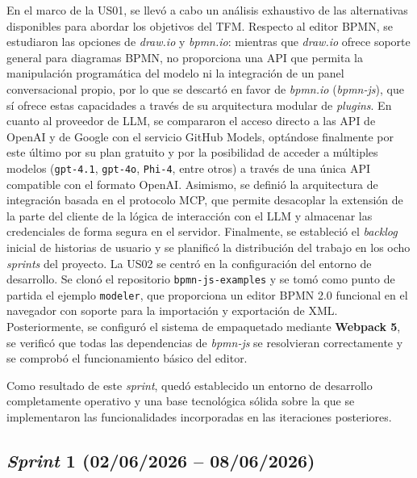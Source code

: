 En el marco de la US01, se llevó a cabo un análisis exhaustivo de las alternativas disponibles para abordar los objetivos del TFM. Respecto al editor BPMN, se estudiaron las opciones de \textit{draw.io} y \textit{bpmn.io}: mientras que \textit{draw.io} ofrece soporte general para diagramas BPMN, no proporciona una API que permita la manipulación programática del modelo ni la integración de un panel conversacional propio, por lo que se descartó en favor de \textit{bpmn.io} (\textit{bpmn-js}), que sí ofrece estas capacidades a través de su arquitectura modular de \textit{plugins}. En cuanto al proveedor de LLM, se compararon el acceso directo a las API de OpenAI y de Google con el servicio GitHub Models, optándose finalmente por este último por su plan gratuito y por la posibilidad de acceder a múltiples modelos (\texttt{gpt-4.1}, \texttt{gpt-4o}, \texttt{Phi-4}, entre otros) a través de una única API compatible con el formato OpenAI. Asimismo, se definió la arquitectura de integración basada en el protocolo MCP, que permite desacoplar la extensión de la parte del cliente de la lógica de interacción con el LLM y almacenar las credenciales de forma segura en el servidor. Finalmente, se estableció el \textit{backlog} inicial de historias de usuario y se planificó la distribución del trabajo en los ocho \textit{sprints} del proyecto.
La US02 se centró en la configuración del entorno de desarrollo. Se clonó el repositorio \texttt{bpmn-js-examples} y se tomó como punto de partida el ejemplo \texttt{modeler}, que proporciona un editor BPMN 2.0 funcional en el navegador con soporte para la importación y exportación de XML. Posteriormente, se configuró el sistema de empaquetado mediante \textbf{Webpack 5}, se verificó que todas las dependencias de \textit{bpmn-js} se resolvieran correctamente y se comprobó el funcionamiento básico del editor. 

Como resultado de este \textit{sprint}, quedó establecido un entorno de desarrollo completamente operativo y una base tecnológica sólida sobre la que se implementaron las funcionalidades incorporadas en las iteraciones posteriores.


\subsection{\textit{Sprint} 1 (02/06/2026 -- 08/06/2026)}
\label{subsec:sprint1}

